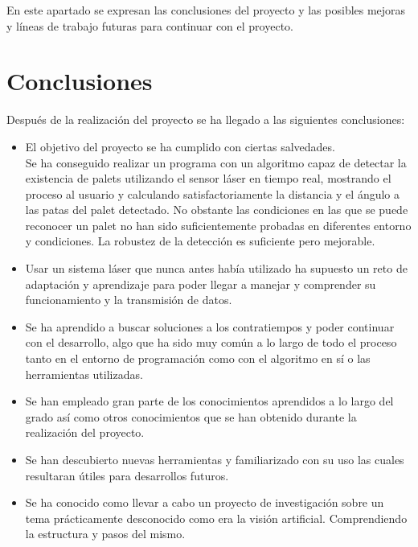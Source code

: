 
En este apartado se expresan las conclusiones del proyecto y las posibles mejoras y líneas de trabajo futuras para continuar con el proyecto.

\section{Conclusiones}

Después de la realización del proyecto se ha llegado a las siguientes conclusiones:

\begin{itemize}
\item El objetivo del proyecto se ha cumplido con ciertas salvedades.\\
	Se ha conseguido realizar un programa con un algoritmo capaz de detectar la existencia de palets utilizando el sensor láser en tiempo real, mostrando el proceso al usuario y calculando satisfactoriamente la distancia y el ángulo a las patas del palet detectado. No obstante las condiciones en las que se puede reconocer un palet no han sido suficientemente probadas en diferentes entorno y condiciones.
La robustez de la detección es suficiente pero mejorable.

\item Usar un sistema láser que nunca antes había utilizado ha supuesto un reto de adaptación y aprendizaje para poder llegar a manejar y comprender su funcionamiento y la transmisión de datos.

\item Se ha aprendido a buscar soluciones a los contratiempos y poder continuar con el desarrollo, algo que ha sido muy común a lo largo de todo el proceso tanto en el entorno de programación como con el algoritmo en sí o las herramientas utilizadas.

\item Se han empleado gran parte de los conocimientos aprendidos a lo largo del grado así como otros conocimientos que se han obtenido durante la realización del proyecto.

\item Se han descubierto nuevas herramientas y familiarizado con su uso las cuales resultaran útiles para desarrollos futuros.

\item Se ha conocido como llevar a cabo un proyecto de investigación sobre un tema prácticamente desconocido como era la visión artificial. Comprendiendo la estructura y pasos del mismo.


\end{itemize}
